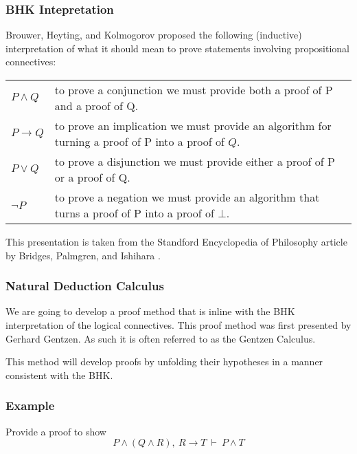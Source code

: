 \documentclass{beamer}
\theoremstyle{indentDefn} \newtheorem{defn}[]{Definition}
\begin{document}
\begin{frame}
  \frametitle{BHK Intepretation}
  Brouwer, Heyting, and Kolmogorov proposed the following (inductive) interpretation of what it should mean to prove statements involving propositional connectives:

  \vspace{0.5cm}

  \begin{center}
    \begin{tabular}{p{1.5cm}p{8cm}}
      $P \land Q$ & to prove a conjunction we must provide both a proof of P and a proof of Q. \\      
      $P \to Q$ & to prove an implication we must provide an algorithm for turning a proof of P into a proof of $Q$.\\
      $P \lor Q$ & to prove a disjunction we must provide either a proof of P or a proof of Q. \\
      $\lnot P$ &  to prove a negation we must provide an algorithm that turns a proof of P into a proof of $\bot$.
    \end{tabular}
  \end{center}

  \vspace{0.5cm}

  This presentation is taken from the Standford Encyclopedia of Philosophy article by Bridges, Palmgren, and Ishihara \cite{sep-mathematics-constructive}.
\end{frame}

\begin{frame}
  \frametitle{Natural Deduction Calculus}

  We are going to develop a proof method that is inline with the BHK interpretation of the logical connectives. This proof method was first presented by Gerhard Gentzen. As such it is often referred to as the Gentzen Calculus. 

  \vspace{0.5cm}

  This method will develop proofs by unfolding their hypotheses in a manner consistent with the BHK.
\end{frame}

\begin{frame}
	\frametitle{Example}
	Provide a proof to show $$P \land (Q \land R), \ R \to T  \ \vdash \ P \land T$$


	\vspace{6cm}
	
\end{frame}
\end{document}
